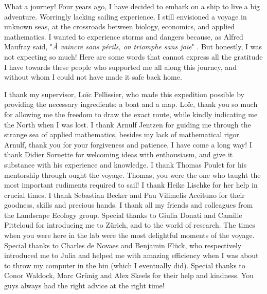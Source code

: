 %
\label{sec:acknowledgement}


What a journey!
% 
Four years ago, I have decided to embark on a ship to live a big adventure.
% 
Worringly lacking sailing experience, I still envisioned a voyage in unknown seas, at the crossroads between biology, economics, and applied mathematics.
% 
I wanted to experience storms and dangers because, as Alfred Maufray said, "\textit{À vaincre sans périls, on triomphe sans joie}" \citep{maufrais1997aventures}.
% 
But honestly, I was not expecting so much!
% 
Here are some words that cannot express all the gratitude I have towards these people who supported me all along this journey, and without whom I could not have made it safe back home.

I thank my supervisor, Loïc Pellissier, who made this expedition possible by providing the necessary ingredients: a boat and a map. Loïc, thank you so much for allowing me the freedom to draw the exact route, while kindly indicating me the North when I was lost.
% 
I thank Arnulf Jentzen for guiding me through the strange sea of applied mathematics, besides my lack of mathematical rigor. Arnulf, thank you for your forgiveness and patience, I have come a long way!
% 
I thank Didier Sornette for welcoming ideas with enthousiasm, and give it substance with his experience and knowledge.
% 
I thank Thomas Poulet for his mentorship through ought the voyage. Thomas, you were the one who taught the most important rudiments required to sail! 
% 
I thank Heike Lischke for her help in crucial times.
% 
I thank Sebastian Becker and Pau Vilimelis Aceituno for their goodness, skills and precious hands.
% 
I thank all my friends and colleagues from the Landscape Ecology group. Special thanks to Giulia Donati and Camille Pitteloud for introducing me to Zürich, and to the world of research. The times when you were here in the lab were the most delightful moments of the voyage.
% 
Special thanks to Charles de Novaes and Benjamin Flück, who respectively introduced me to Julia and helped me with amazing efficiency when I was about to throw my computer in the bin (which I eventually did).
% 
Special thanks to Conor Waldock, Marc Grünig and Alex Skeels for their help and kindness. You guys always had the right advice at the right time!

